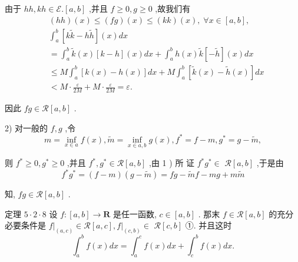 由于 ${hh},{kh} \in  \mathcal{E}.\left\lbrack  {a,b}\right\rbrack$ ,并且 $f \geq  0,g \geq  0$ ,故我们有
\begin{align*}
	&\left( {hh}\right) \left( x\right)  \leq  \left( {fg}\right) \left( x\right)  \leq  \left( {kk}\right) \left( x\right) ,\;\forall x \in  \left\lbrack  {a,b}\right\rbrack  ,\\
	&{\int }_{a}^{b}\left\lbrack  {k\widetilde{k} - h\widetilde{h}}\right\rbrack  \left( x\right) {dx}\\
	&= {\int }_{a}^{b}\widetilde{k}\left( x\right) \left\lbrack  {k - h}\right\rbrack  \left( x\right) {dx} + {\int }_{a}^{b}h\left( x\right) \widetilde{k}\left\lbrack  {-\widetilde{h}}\right\rbrack  \left( x\right) {dx}\\
	&\leq  M{\int }_{a}^{b}\left\lbrack  {k\left( x\right)  - h\left( x\right) }\right\rbrack  {dx} + M{\int }_{a}^{b}\left\lbrack  {\widetilde{k}\left( x\right)  - \widetilde{h}\left( x\right) }\right\rbrack  {dx}\\
	&< M \cdot  \frac{\varepsilon }{2M} + M \cdot  \frac{\varepsilon }{2M} = \varepsilon .
\end{align*}

因此 ${fg} \in  \mathcal{R}\left\lbrack  {a,b}\right\rbrack$ .

2) 对一般的 $f,g$ ,令
$$m = \mathop{\inf }\limits_{{x \in  a}}f\left( x\right) ,\widetilde{m} = \mathop{\inf }\limits_{{x \in  a,b}}g\left( x\right) ,{f}^{ * } = f - m,{g}^{ * } = g - \widetilde{m},$$

则 ${f}^{ * } \geq  0,{g}^{ * } \geq  0$ ,并且 ${f}^{ * },{g}^{ * } \in  \mathcal{R}\left\lbrack  {a,b}\right\rbrack$ ,由 1 ) 所 证 ${f}^{ * }{g}^{ * } \in$  $\mathcal{R}\left\lbrack  {a,b}\right\rbrack$ ,于是由
$${f}^{ * }{g}^{ * } = \left( {f - m}\right) \left( {g - \widetilde{m}}\right)  = {fg} - \widetilde{m}f - {mg} + m\widetilde{m}$$

知, ${fg} \in  \mathcal{R}\left\lbrack  {a,b}\right\rbrack$ .

定理 $5 \cdot  2 \cdot  8$ 设 $f : \left\lbrack  {a,b}\right\rbrack   \rightarrow  \mathbf{R}$ 是任一函数, $c \in  \left\lbrack  {a,b}\right\rbrack$ . 那末 $f \in  \mathcal{R}\left\lbrack  {a,b}\right\rbrack$ 的充分必要条件是 ${\left. f\right| }_{\left( a,c\right) } \in  \mathcal{R}\left\lbrack  {a,c}\right\rbrack  ,{\left. f\right| }_{\left( c,b\right) } \in$  $\mathcal{R}\left\lbrack  {c,b}\right\rbrack$ ①. 并且这时
$${\int }_{a}^{b}f\left( x\right) {dx} = {\int }_{a}^{c}f\left( x\right) {dx} + {\int }_{c}^{b}f\left( x\right) {dx}.$$

